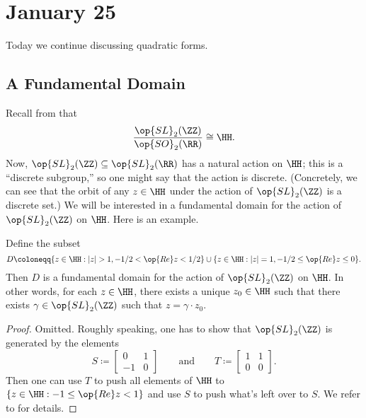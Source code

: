 \documentclass[../notes.tex]{subfiles}
\begin{document}
\section{January 25}

Today we continue discussing quadratic forms.

\subsection{A Fundamental Domain}
Recall from  that
\[\frac{\op{SL}_2(\ZZ)}{\op{SO}_2(\RR)}\cong\HH.\]
Now, $\op{SL}_2(\ZZ)\subseteq\op{SL}_2(\RR)$ has a natural action on $\HH$; this is a ``discrete subgroup,'' so one might say that the action is discrete. (Concretely, we can see that the orbit of any $z\in\HH$ under the action of $\op{SL}_2(\ZZ)$ is a discrete set.) We will be interested in a fundamental domain for the action of $\op{SL}_2(\ZZ)$ on $\HH$. Here is an example.
\begin{proposition} \label{prop:fund-domain}
	Define the subset
	\[D\coloneqq\{z\in\HH:|z|>1,-1/2<\op{Re}z<1/2\}\cup\{z\in\HH:|z|=1,-1/2\le\op{Re}z\le0\}.\]
	Then $D$ is a fundamental domain for the action of $\op{SL}_2(\ZZ)$ on $\HH$. In other words, for each $z\in\HH$, there exists a unique $z_0\in\HH$ such that there exists $\gamma\in\op{SL}_2(\ZZ)$ such that $z=\gamma\cdot z_0$.
\end{proposition}
\begin{proof}
	Omitted. Roughly speaking, one has to show that $\op{SL}_2(\ZZ)$ is generated by the elements
	\[S\coloneqq\begin{bmatrix}
		0 & 1 \\
		-1 & 0
	\end{bmatrix}\qquad\text{and}\qquad T\coloneqq\begin{bmatrix}
		1 & 1 \\
		0 & 0
	\end{bmatrix}.\]
	Then one can use $T$ to push all elements of $\HH$ to $\{z\in\HH:-1\le\op{Re}z<1\}$ and use $S$ to push what's left over to $S$. We refer to \cite{course-arithmetic} for details.
\end{proof}
\end{document}
